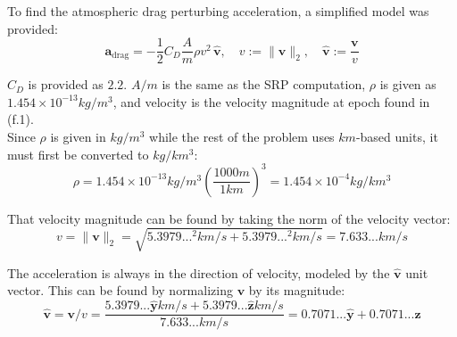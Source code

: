 \documentclass[titlepage]{article}
\begin{document}
To find the atmospheric drag perturbing acceleration, a simplified model was provided:
\begin{equation}
	\boldsymbol{a}_{\text{drag}} = -\frac{1}{2}C_D\frac{A}{m}\rho v^2\,\hat{\boldsymbol{v}}, \quad v := \|\boldsymbol{v}\|_2, \quad \hat{\boldsymbol{v}} := \frac{\boldsymbol{v}}{v}
\end{equation}

$C_D$ is provided as $2.2$. $A/m$ is the same as the SRP computation, $\rho$ is given as $1.454\times10^{-13}kg/m^3$, and velocity is the velocity magnitude at epoch found in (f.1).\\

Since $\rho$ is given in $kg/m^3$ while the rest of the problem uses $km$-based units, it must first be converted to $kg/km^3$:
\begin{equation}
	\rho=1.454\times10^{-13}kg/m^3\left(\frac{1000m}{1km}\right)^3=1.454\times10^{-4}kg/km^3
\end{equation}

That velocity magnitude can be found by taking the norm of the velocity vector:
\begin{equation}
	v=\|\boldsymbol{v}\|_2=\sqrt{5.3979...^2km/s+5.3979...^2km/s}=7.633...km/s
\end{equation}

The acceleration is always in the direction of velocity, modeled by the $\hat{\boldsymbol{v}}$ unit vector. This can be found by normalizing $\boldsymbol{v}$ by its magnitude:
\begin{equation}
	\hat{\boldsymbol{v}}=\boldsymbol{v}/v=\frac{5.3979...\hat{\boldsymbol{y}}km/s+5.3979...\hat{\boldsymbol{z}}km/s}{7.633...km/s}=0.7071...\hat{\boldsymbol{y}}+0.7071...\hat{\boldsymbol{z}}
\end{equation}
\end{document}

